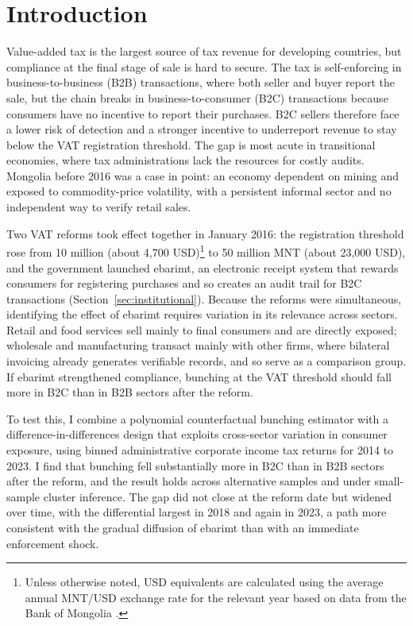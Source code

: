 \documentclass[12pt,oneside,a4paper]{report}
\begin{document}
\tableofcontents

\listoffigures
\listoftables
\newpage


\chapter{Introduction}

Value-added tax is the largest source of tax revenue for developing countries, but compliance at the final stage of sale is hard to secure. The tax is self-enforcing in business-to-business (B2B) transactions, where both seller and buyer report the sale, but the chain breaks in business-to-consumer (B2C) transactions because consumers have no incentive to report their purchases. B2C sellers therefore face a lower risk of detection and a stronger incentive to underreport revenue to stay below the VAT registration threshold. The gap is most acute in transitional economies, where tax administrations lack the resources for costly audits. Mongolia before 2016 was a case in point: an economy dependent on mining and exposed to commodity-price volatility, with a persistent informal sector and no independent way to verify retail sales.

Two VAT reforms took effect together in January 2016: the registration threshold rose from 10 million (about 4,700 USD)\footnote{Unless otherwise noted, USD equivalents are calculated using the average annual MNT/USD exchange rate for the relevant year based on data from the Bank of Mongolia \parencite{mongolbank}.} to 50 million MNT (about 23,000 USD), and the government launched ebarimt, an electronic receipt system that rewards consumers for registering purchases and so creates an audit trail for B2C transactions (Section~\ref{sec:institutional}). Because the reforms were simultaneous, identifying the effect of ebarimt requires variation in its relevance across sectors. Retail and food services sell mainly to final consumers and are directly exposed; wholesale and manufacturing transact mainly with other firms, where bilateral invoicing already generates verifiable records, and so serve as a comparison group. If ebarimt strengthened compliance, bunching at the VAT threshold should fall more in B2C than in B2B sectors after the reform.

To test this, I combine a polynomial counterfactual bunching estimator with a difference-in-differences design that exploits cross-sector variation in consumer exposure, using binned administrative corporate income tax returns for 2014 to 2023. I find that bunching fell substantially more in B2C than in B2B sectors after the reform, and the result holds across alternative samples and under small-sample cluster inference. The gap did not close at the reform date but widened over time, with the differential largest in 2018 and again in 2023, a path more consistent with the gradual diffusion of ebarimt than with an immediate enforcement shock.
\end{document}
